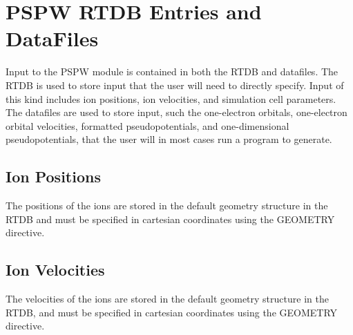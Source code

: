 \section{PSPW RTDB Entries and DataFiles}
\label{sec:pspw_data}
Input to the PSPW module is contained in both the RTDB and datafiles.
The RTDB is used to store input that the user will need to directly specify.
Input of this kind includes ion positions, ion velocities, and simulation cell
parameters.  The datafiles are used to store input, such the one-electron 
orbitals, one-electron orbital velocities, formatted pseudopotentials, 
and one-dimensional pseudopotentials, that the user will in most cases
run a program to generate.

\subsection{Ion Positions}
The positions of the ions are stored in the default geometry structure
in the RTDB and must be specified in cartesian 
coordinates using the GEOMETRY directive.

\subsection{Ion Velocities}
The velocities of the ions are stored in the default geometry structure
in the RTDB, and must be specified in cartesian 
coordinates using the GEOMETRY directive.


